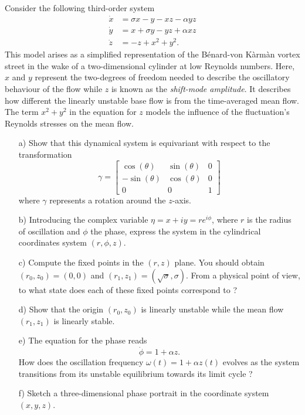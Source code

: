 \begin{problem}
  Consider the following third-order system
  \[
  \begin{aligned}
    \dot{x} & = \sigma x - y - xz - \alpha yz\\
    \dot{y} & = x + \sigma y - yz + \alpha xz\\
    \dot{z} & = -z + x^2 + y^2.
  \end{aligned}
  \]
  This model arises as a simplified representation of the Bénard-von K\`arm\`an vortex street in the wake of a two-dimensional cylinder at low Reynolds numbers.
  Here, $x$ and $y$ represent the two-degrees of freedom needed to describe the oscillatory behaviour of the flow while $z$ is known as the \emph{shift-mode amplitude}.
  It describes how different the linearly unstable base flow is from the time-averaged mean flow.
  The term $x^2 + y^2$ in the equation for $z$ models the influence of the fluctuation's Reynolds stresses on the mean flow.

  \begin{enumerate}
  \item[a)] Show that this dynamical system is equivariant with respect to the transformation
    \[
    \gamma
    =
    \begin{bmatrix}
      \cos(\theta) & \sin(\theta) & 0 \\
      -\sin(\theta) & \cos(\theta) & 0 \\
      0 & 0 & 1
    \end{bmatrix}
    \]
    where $\gamma$ represents a rotation around the $z$-axis.

  \item[b)] Introducing the complex variable $\eta = x + i y = r e^{i\phi}$, where $r$ is the radius of oscillation and $\phi$ the phase, express the system in the cylindrical coordinates system $(r, \phi, z)$.

  \item[c)] Compute the fixed points in the $(r, z)$ plane.
    You should obtain $(r_0, z_0) = (0, 0)$ and $(r_1, z_1) = (\sqrt{\sigma}, \sigma)$.
    From a physical point of view, to what state does each of these fixed points correspond to ?

  \item[d)] Show that the origin $(r_0, z_0)$ is linearly unstable while the mean flow $(r_1, z_1)$ is linearly stable.

  \item[e)] The equation for the phase reads
    \[
    \dot{\phi} = 1 + \alpha z.
    \]
    How does the oscillation frequency $\omega(t) = 1 + \alpha z(t)$ evolves as the system transitions from its unstable equilibrium towards its limit cycle ?

  \item[f)] Sketch a three-dimensional phase portrait in the coordinate system $(x, y, z)$.
  \end{enumerate}
\end{problem}

